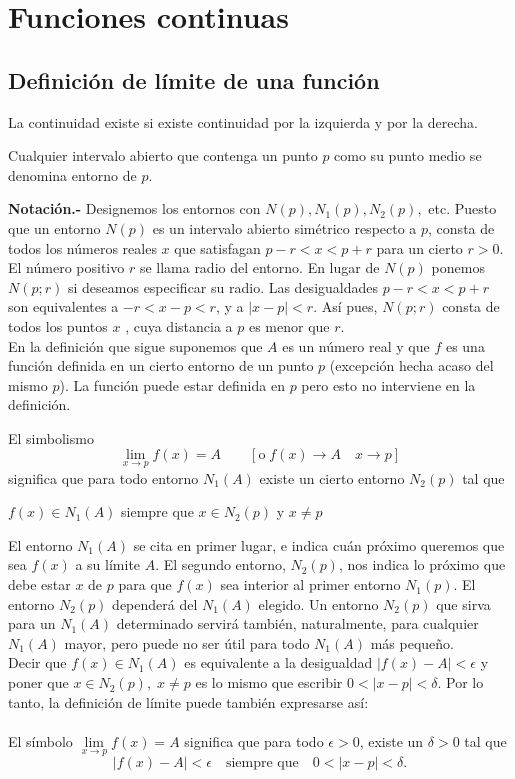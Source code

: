 \chapter{Funciones continuas}
\setcounter{section}{1}
\section{Definición de límite de una función}
La continuidad existe si existe  continuidad por la izquierda y por la derecha.

    \begin{def.}
	Cualquier intervalo abierto que contenga un punto $p$ como su punto medio se denomina entorno de $p$.
    \end{def.}

\textbf{Notación.-} Designemos los entornos con $N(p), N_1(p), N_2(p),$ etc. Puesto que un entorno $N(p)$ es un intervalo abierto simétrico respecto a $p$, consta de todos los números reales $x$ que satisfagan $p-r<x<p+r$ para un cierto $r>0$. El número positivo $r$ se llama radio del entorno. En lugar de $N(p)$ ponemos $N(p;r)$ si deseamos especificar su radio. Las desigualdades $p-r<x<p+r$ son equivalentes a $-r<x-p<r$, y a $|x-p|<r$. Así pues, $N(p;r)$ consta de todos los puntos $x$ , cuya distancia a $p$ es menor que $r$.\\
En la definición que sigue suponemos que $A$ es un número real y que $f$ es una función definida en un cierto entorno de un punto $p$ (excepción hecha acaso del mismo $p$). La función puede estar definida en $p$ pero esto no interviene en la definición.\\

    \begin{def.}
	El simbolismo $$\lim_{x\to p}f(x)=A\qquad [\mbox{o}\; {f(x)\to A}\quad {x\to p}]$$
	significa que para todo entorno $N_1(A)$ existe un cierto entorno $N_2(p)$ tal que 
	\begin{center}
	    $f(x)\in N_1(A)$ siempre que $x\in N_2(p)$ y $x\neq p$
	\end{center}
	\vspace{0.3cm}
	El entorno $N_1(A)$ se cita en primer lugar, e indica cuán próximo queremos que sea $f(x)$ a su límite $A$. El segundo entorno, $N_2(p)$, nos indica lo próximo que debe estar $x$ de $p$ para que $f(x)$ sea interior al primer entorno $N_1(p)$. El entorno $N_2(p)$ dependerá del $N_1(A)$ elegido. Un entorno $N_2(p)$ que sirva para un $N_1(A)$ determinado servirá también, naturalmente, para cualquier $N_1(A)$ mayor, pero puede no ser útil para todo $N_1(A)$ más pequeño.\\
	Decir que $f(x)\in N_1(A)$ es equivalente a la desigualdad $|f(x)-A|<\epsilon$ y poner que $x\in N_2(p),\; x\neq p$ es lo mismo que escribir $0<|x-p|<\delta$. Por lo tanto, la definición de límite puede también expresarse así:\\\\
	El símbolo $\lim\limits_{x\to p}f(x)=A$ significa que para todo $\epsilon > 0$, existe un $\delta >0$ tal que $$|f(x)-A|<\epsilon \quad \mbox{siempre que}\quad 0<|x-p|<\delta.$$
    \end{def.}

